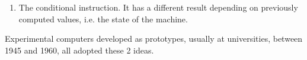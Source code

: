 \begin{description}
\begin{enumerate}
    \item The conditional instruction. It has a different result depending on
    previously computed values, i.e. the state of the machine.
  \end{enumerate}
  Experimental computers developed as prototypes, usually at universities, between
  1945 and 1960, all adopted these 2 ideas.
\end{description}
